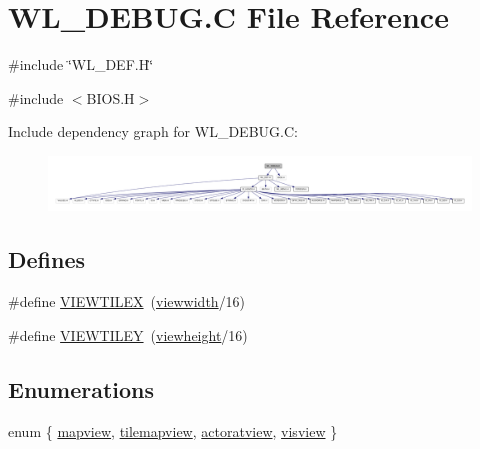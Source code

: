\hypertarget{WL__DEBUG_8C}{
\section{WL\_\-DEBUG.C File Reference}
\label{WL__DEBUG_8C}
}
{\ttfamily \#include \char`\"{}WL\_\-DEF.H\char`\"{}}\par
{\ttfamily \#include $<$BIOS.H$>$}\par
Include dependency graph for WL\_\-DEBUG.C:
\nopagebreak
\begin{figure}[H]
\begin{center}
\leavevmode
\includegraphics[width=400pt]{WL__DEBUG_8C__incl}
\end{center}
\end{figure}
\subsection*{Defines}
\begin{DoxyCompactItemize}
\item 
\#define \hyperlink{WL__DEBUG_8C_a77945c3643f65749c3d8cd087cb85eed}{VIEWTILEX}~(\hyperlink{WL__MAIN_8C_a9d8a9239749c5174f26cf73ab9625c3b}{viewwidth}/16)
\item 
\#define \hyperlink{WL__DEBUG_8C_a288430a87bfe2090e84963840519a619}{VIEWTILEY}~(\hyperlink{WL__MAIN_8C_abbbcb01b7dcc4679d07cde1acfbf1412}{viewheight}/16)
\end{DoxyCompactItemize}
\subsection*{Enumerations}
\begin{DoxyCompactItemize}
\item 
enum \{ \hyperlink{WL__DEBUG_8C_adf764cbdea00d65edcd07bb9953ad2b7a49b0ed5f566fdac620e78abf0bd322f1}{mapview}, 
\hyperlink{WL__DEBUG_8C_adf764cbdea00d65edcd07bb9953ad2b7a9030c0217671c02f0b10d1d51b420cc3}{tilemapview}, 
\hyperlink{WL__DEBUG_8C_adf764cbdea00d65edcd07bb9953ad2b7a184216f1fae1c92c0f41d21ba4afafea}{actoratview}, 
\hyperlink{WL__DEBUG_8C_adf764cbdea00d65edcd07bb9953ad2b7a2843b61646893c3190e9e8229d2e0c3b}{visview}
 \}
\end{DoxyCompactItemize}
